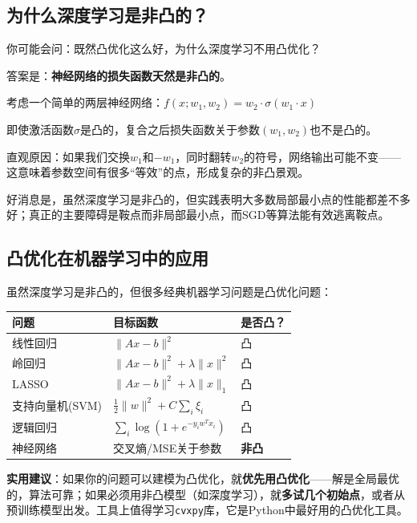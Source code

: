 \subsection*{为什么深度学习是非凸的？}

你可能会问：既然凸优化这么好，为什么深度学习不用凸优化？

答案是：\textbf{神经网络的损失函数天然是非凸的}。

\begin{example}[非凸性的来源]
考虑一个简单的两层神经网络：$f(x; w_1, w_2) = w_2 \cdot \sigma(w_1 \cdot x)$

即使激活函数$\sigma$是凸的，复合之后损失函数关于参数$(w_1, w_2)$也不是凸的。

直观原因：如果我们交换$w_1$和$-w_1$，同时翻转$w_2$的符号，网络输出可能不变——这意味着参数空间有很多``等效''的点，形成复杂的非凸景观。
\end{example}

好消息是，虽然深度学习是非凸的，但实践表明大多数局部最小点的性能都差不多好；真正的主要障碍是鞍点而非局部最小点，而SGD等算法能有效逃离鞍点。

\subsection*{凸优化在机器学习中的应用}

虽然深度学习是非凸的，但很多经典机器学习问题是凸优化问题：

\begin{center}
\renewcommand{\arraystretch}{1.3}
\begin{tabular}{l|l|l}
\toprule
\textbf{问题} & \textbf{目标函数} & \textbf{是否凸？} \\
\midrule
线性回归 & $\|Ax - b\|^2$ & 凸 \\
岭回归 & $\|Ax - b\|^2 + \lambda\|x\|^2$ & 凸 \\
LASSO & $\|Ax - b\|^2 + \lambda\|x\|_1$ & 凸 \\
支持向量机(SVM) & $\frac{1}{2}\|w\|^2 + C\sum_i \xi_i$ & 凸 \\
逻辑回归 & $\sum_i \log(1 + e^{-y_i w^T x_i})$ & 凸 \\
\midrule
神经网络 & 交叉熵/MSE关于参数 & \textbf{非凸} \\
\bottomrule
\end{tabular}
\end{center}

\begin{insightbox}
\textbf{实用建议}：如果你的问题可以建模为凸优化，就\textbf{优先用凸优化}——解是全局最优的，算法可靠；如果必须用非凸模型（如深度学习），就\textbf{多试几个初始点}，或者从预训练模型出发。工具上值得学习\texttt{cvxpy}库，它是Python中最好用的凸优化工具。
\end{insightbox}